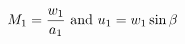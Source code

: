 \documentclass[10pt]{article}
\begin{document}
\begin{align*}M_{1}= \frac{w_{1}}{a_{1}} \ {\rm and} \ u_{1}=w_{1} \sin \beta\end{align*}
\end{document}
